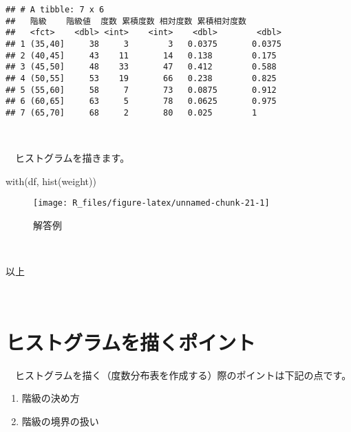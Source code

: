 \documentclass[
  12pt,
]{book}
\newenvironment{Shaded}{\begin{snugshade}}{\end{snugshade}}
\newcommand{\FunctionTok}[1]{\textcolor[rgb]{0.00,0.00,0.00}{#1}}
\newcommand{\NormalTok}[1]{#1}
\providecommand{\tightlist}{%
  \setlength{\itemsep}{0pt}\setlength{\parskip}{0pt}}
\begin{document}
\begin{verbatim}
## # A tibble: 7 x 6
##   階級    階級値  度数 累積度数 相対度数 累積相対度数
##   <fct>    <dbl> <int>    <int>    <dbl>        <dbl>
## 1 (35,40]     38     3        3   0.0375       0.0375
## 2 (40,45]     43    11       14   0.138        0.175 
## 3 (45,50]     48    33       47   0.412        0.588 
## 4 (50,55]     53    19       66   0.238        0.825 
## 5 (55,60]     58     7       73   0.0875       0.912 
## 6 (60,65]     63     5       78   0.0625       0.975 
## 7 (65,70]     68     2       80   0.025        1
\end{verbatim}

　

　ヒストグラムを描きます。

\begin{Shaded}
\begin{Highlighting}[]
\FunctionTok{with}\NormalTok{(df, }\FunctionTok{hist}\NormalTok{(weight))}
\end{Highlighting}
\end{Shaded}

\begin{figure}[H]

{\centering \texttt{[image: R\_files/figure-latex/unnamed-chunk-21-1]} 

}

\caption{解答例}\label{fig:unnamed-chunk-21}
\end{figure}

　

以上

　

\hypertarget{ux30d2ux30b9ux30c8ux30b0ux30e9ux30e0ux3092ux63cfux304fux30ddux30a4ux30f3ux30c8}{%
\section*{ヒストグラムを描くポイント}\label{ux30d2ux30b9ux30c8ux30b0ux30e9ux30e0ux3092ux63cfux304fux30ddux30a4ux30f3ux30c8}}

　ヒストグラムを描く（度数分布表を作成する）際のポイントは下記の点です。

\begin{enumerate}
\def\labelenumi{\arabic{enumi}.}
\tightlist
\item
  階級の決め方
\item
  階級の境界の扱い
\end{enumerate}
\end{document}
